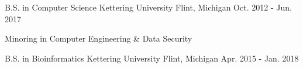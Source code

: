 

\begin{cventries}




  \cventry
    {B.S. in Computer Science} %
    {Kettering University} %
    {Flint, Michigan} %
    {Oct. 2012 - Jun. 2017} %
    {
      \begin{cvitems} %
        \item {Minoring in Computer Engineering \& Data Security}
      \end{cvitems}
    }

  \cventry
    {B.S. in Bioinformatics } %
    {Kettering University} %
    {Flint, Michigan} %
    {Apr. 2015 - Jan. 2018} %
    {
      \begin{cvitems} %
      \end{cvitems}
    }

\end{cventries}
